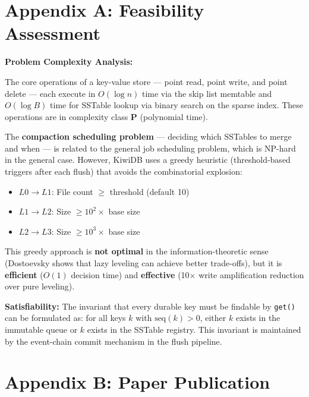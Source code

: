 \documentclass[oneside,a4paper,12pt]{book}
\begin{document}
\section{Appendix A: Feasibility Assessment}

\textbf{Problem Complexity Analysis:}

The core operations of a key-value store --- point read, point write, and point delete --- each execute in $O(\log n)$ time via the skip list memtable and $O(\log B)$ time for SSTable lookup via binary search on the sparse index. These operations are in complexity class \textbf{P} (polynomial time).

The \textbf{compaction scheduling problem} --- deciding which SSTables to merge and when --- is related to the general job scheduling problem, which is NP-hard in the general case. However, KiwiDB uses a greedy heuristic (threshold-based triggers after each flush) that avoids the combinatorial explosion:
\begin{itemize}[leftmargin=2em]
    \item $L0 \rightarrow L1$: File count $\geq$ threshold (default 10)
    \item $L1 \rightarrow L2$: Size $\geq 10^2 \times$ base size
    \item $L2 \rightarrow L3$: Size $\geq 10^3 \times$ base size
\end{itemize}

This greedy approach is \textbf{not optimal} in the information-theoretic sense (Dostoevsky \cite{c11} shows that lazy leveling can achieve better trade-offs), but it is \textbf{efficient} ($O(1)$ decision time) and \textbf{effective} (10$\times$ write amplification reduction over pure leveling).

\textbf{Satisfiability:} The invariant that every durable key must be findable by \texttt{get()} can be formulated as: for all keys $k$ with $\text{seq}(k) > 0$, either $k$ exists in the immutable queue or $k$ exists in the SSTable registry. This invariant is maintained by the event-chain commit mechanism in the flush pipeline.

\section{Appendix B: Paper Publication}

\end{document}
